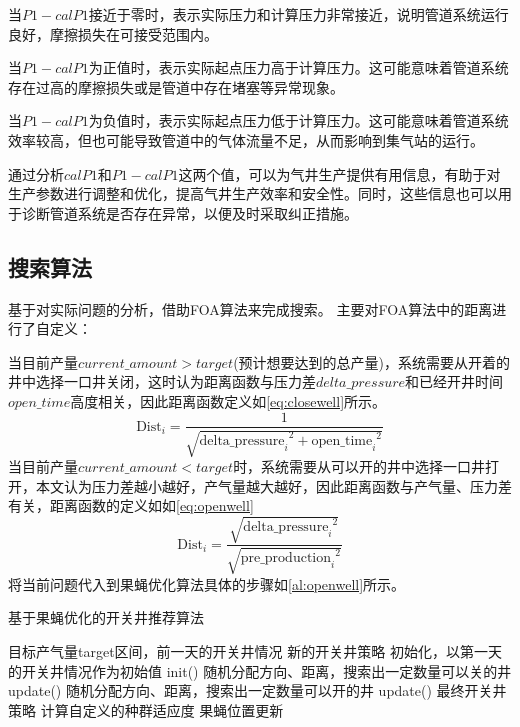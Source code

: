 当$P1 - calP1$接近于零时，表示实际压力和计算压力非常接近，说明管道系统运行良好，摩擦损失在可接受范围内。 

当$P1 - calP1$为正值时，表示实际起点压力高于计算压力。这可能意味着管道系统存在过高的摩擦损失或是管道中存在堵塞等异常现象。 

当$P1 - calP1$为负值时，表示实际起点压力低于计算压力。这可能意味着管道系统效率较高，但也可能导致管道中的气体流量不足，从而影响到集气站的运行。 

通过分析$calP1$和$P1 - calP1$这两个值，可以为气井生产提供有用信息，有助于对生产参数进行调整和优化，提高气井生产效率和安全性。同时，这些信息也可以用于诊断管道系统是否存在异常，以便及时采取纠正措施。
\subsection{搜索算法}
基于对实际问题的分析，借助FOA算法来完成搜索。
主要对FOA算法中的距离进行了自定义：

当目前产量$current\_amount>target$(预计想要达到的总产量)，系统需要从开着的井中选择一口井关闭，这时认为距离函数与压力差$delta\_pressure$和已经开井时间$open\_time$高度相关，因此距离函数定义如\eqref{eq:closewell}所示。
\begin{equation}
    \text{Dist}_i = \frac{1}{\sqrt{{\text{delta\_pressure}_i}^2 + {\text{open\_time}_i}^2}}
    \label{eq:closewell}
\end{equation}
当目前产量$current\_amount<target$时，系统需要从可以开的井中选择一口井打开，本文认为压力差越小越好，产气量越大越好，因此距离函数与产气量、压力差有关，距离函数的定义如如\eqref{eq:openwell}
\begin{equation}
    \text{Dist}_i = \frac{\sqrt{{\text{delta\_pressure}_i}^2}}{\sqrt{{\text{pre\_production}_i}^2}}
    \label{eq:openwell}
\end{equation}
将当前问题代入到果蝇优化算法具体的步骤如\ref{al:openwell}所示。
\begin{algorithm}[H]
    \caption{基于果蝇优化的开关井推荐算法}
    \begin{algorithmic}[1]
       \Require 目标产气量target区间，前一天的开关井情况
       \Ensure  新的开关井策略
       \State 初始化，以第一天的开关井情况作为初始值 init()
                \State 随机分配方向、距离，搜索出一定数量可以关的井 update()
                \State 随机分配方向、距离，搜索出一定数量可以开的井 update()
            \Else
                \State \Return 最终开关井策略
            \EndIf
            \State 计算自定义的种群适应度
            \State 果蝇位置更新
        \EndWhile
    \end{algorithmic}
    \label{al:openwell}
\end{algorithm}
